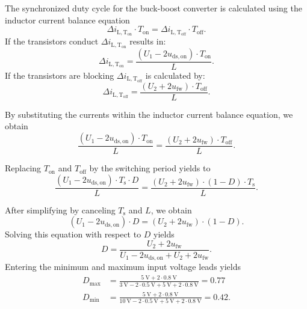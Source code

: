 \begin{solutionblock}
	The synchronized duty cycle for the buck-boost converter is calculated using the inductor current balance equation
	\begin{equation*}
		\Delta i_\mathrm{L,T_\mathrm{on}} \cdot T_\mathrm{on}=\Delta i_\mathrm{L,T_\mathrm{off}} \cdot T_\mathrm{off}.
	\end{equation*}
	If the transistors conduct $\Delta i_\mathrm{L,T_\mathrm{on}}$ results in:
	\begin{equation*}
		\Delta i_\mathrm{L,T_\mathrm{on}}=\frac{(U_\mathrm{1}-2u_\mathrm{ds,on}) \cdot T_\mathrm{on} }{L}.
	\end{equation*}
	If the transistors are blocking $\Delta i_\mathrm{L,T_\mathrm{off}}$ is calculated by:
	\begin{equation*}
		\Delta i_\mathrm{L,T_\mathrm{off}}=\frac{(U_\mathrm{2}+ 2u_\mathrm{fw}) \cdot T_\mathrm{off}}{L}.
	\end{equation*}

	By substituting the currents within the inductor current balance equation, we obtain
	\begin{equation*}
		\frac{(U_\mathrm{1}-2u_\mathrm{ds,on}) \cdot T_\mathrm{on}}{L}=\frac{(U_\mathrm{2}+2u_\mathrm{fw}) \cdot T_\mathrm{off}}{L}.
	\end{equation*}

	Replacing $T_\mathrm{on}$ and $T_\mathrm{off}$ by the switching period yields to
	\begin{equation*}
		\frac{(U_\mathrm{1}-2u_\mathrm{ds,on}) \cdot T_\mathrm{s} \cdot D}{L} =
		\frac{(U_\mathrm{2}+2u_\mathrm{fw}) \cdot (1-D) \cdot T_\mathrm{s}}{L}.
	\end{equation*}

	After simplifying by canceling $T_\mathrm{s}$ and $L$, we obtain
	\begin{equation*}
		(U_\mathrm{1}-2u_\mathrm{ds,on}) \cdot D =
		(U_\mathrm{2}+2u_\mathrm{fw}) \cdot (1-D).
	\end{equation*}
	Solving this equation with respect to $D$ yields
	\begin{equation*}
		D = \frac{U_\mathrm{2}+2u_\mathrm{fw}}{U_\mathrm{1}-2u_\mathrm{ds,on}+U_\mathrm{2}+2u_\mathrm{fw}}.
	\end{equation*}
	Entering the minimum and maximum input voltage leads yields
	\begin{align*}
		D_\mathrm{max} & = \frac{\SI{5}{\volt}+ 2 \cdot \SI{0.8}{\volt}}{\SI{3}{\volt} - 2 \cdot \SI{0.5}{\volt} + \SI{5}{\volt}+ 2 \cdot \SI{0.8}{\volt}}
		= 0.77                                                                                                                                              \\
		D_\mathrm{min} & = \frac{\SI{5}{\volt}+ 2 \cdot \SI{0.8}{\volt}}{\SI{10}{\volt} - 2 \cdot \SI{0.5}{\volt} + \SI{5}{\volt}+ 2 \cdot \SI{0.8}{\volt}}
		= 0.42.
	\end{align*}
\end{solutionblock}


